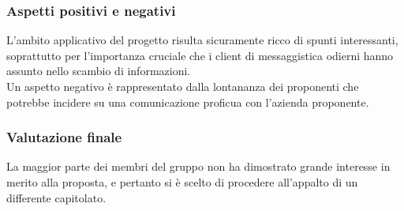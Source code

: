		\subsubsection{Aspetti positivi e negativi}
		L'ambito applicativo del progetto risulta sicuramente ricco di spunti interessanti, soprattutto per l'importanza cruciale che i client di 
		messaggistica odierni hanno assunto nello scambio di informazioni.
		\\Un aspetto negativo è rappresentato dalla lontananza dei proponenti che potrebbe incidere su una comunicazione proficua con l'azienda 
		proponente.
		\subsubsection{Valutazione finale}
		La maggior parte dei membri del gruppo non ha dimostrato grande interesse in merito alla proposta, e pertanto si è scelto di procedere 
		all'appalto di un differente capitolato.


